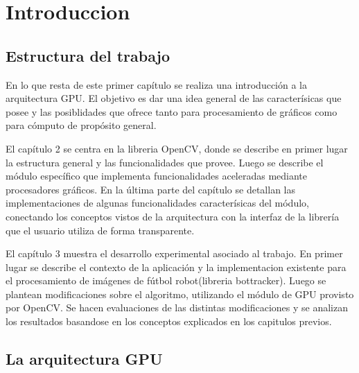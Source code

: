 \documentclass[a4paper,10pt]{report}
\begin{document}
\chapter{Introduccion}

\section{Estructura del trabajo}
En lo que resta de este primer capítulo se realiza una introducción a la arquitectura GPU. 
El objetivo es dar una idea general de las caracterísicas que posee y las posiblidades que ofrece tanto para procesamiento de gráficos como para cómputo de propósito general.


El capítulo 2 se centra en la libreria OpenCV, donde se describe en primer lugar la estructura general y las funcionalidades que provee. 
Luego se describe el módulo específico que implementa funcionalidades aceleradas mediante procesadores gráficos.
En la última parte del capítulo se detallan las implementaciones de algunas funcionalidades caracterísicas del módulo, conectando los conceptos vistos de la arquitectura con la interfaz de la librería que el usuario utiliza de forma transparente. 


El capítulo 3 muestra el desarrollo experimental asociado al trabajo. En primer lugar se describe el contexto de la aplicación y la implementacion existente para el procesamiento de imágenes de fútbol robot(libreria bottracker).
Luego se plantean modificaciones sobre el algoritmo, utilizando el módulo de GPU provisto por OpenCV. Se hacen evaluaciones de las distintas modificaciones y se analizan los resultados basandose en los conceptos explicados en los capitulos previos.













\section{La arquitectura GPU}
\end{document}
